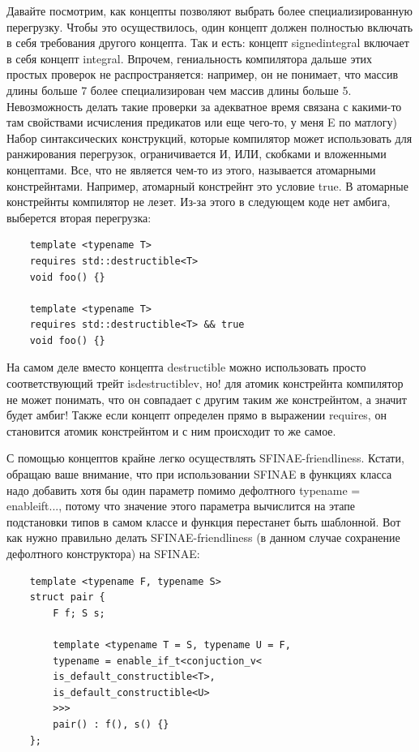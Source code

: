 \documentclass[12pt, a4paper]{article}
\begin{document}
\par Давайте посмотрим, как концепты позволяют выбрать более специализированную перегрузку. Чтобы это осуществилось, один концепт должен полностью включать в себя требования другого концепта. Так и есть: концепт signed\textunderscore integral включает в себя концепт integral. Впрочем, гениальность компилятора дальше этих простых проверок не распространяется: например, он не понимает, что массив длины больше 7 более специализирован чем массив длины больше 5. Невозможность делать такие проверки за адекватное время связана с какими-то там свойствами исчисления предикатов или еще чего-то, у меня E по матлогу) Набор синтаксических конструкций, которые компилятор может использовать для ранжирования перегрузок, ограничивается И, ИЛИ, скобками и вложенными концептами. Все, что не является чем-то из этого, называется атомарными констрейнтами. Например, атомарный констрейнт это условие true. В атомарные констрейнты компилятор не лезет. Из-за этого в следующем коде нет амбига, выберется вторая перегрузка:
\begin{verbatim}
	template <typename T>
	requires std::destructible<T>
	void foo() {}
	
	template <typename T>
	requires std::destructible<T> && true
	void foo() {}
\end{verbatim}
На самом деле вместо концепта destructible можно использовать просто соответствующий трейт is\textunderscore destructible\textunderscore v, но! для атомик констрейнта компилятор не может понимать, что он совпадает с другим таким же констрейнтом, а значит будет амбиг! Также если концепт определен прямо в выражении requires, он становится атомик констрейнтом и с ним происходит то же самое.
\par С помощью концептов крайне легко осуществлять SFINAE-friendliness. Кстати, обращаю ваше внимание, что при использовании SFINAE в функциях класса надо добавить хотя бы один параметр помимо дефолтного typename = enable\textunderscore if\textunderscore t..., потому что значение этого параметра вычислится на этапе подстановки типов в самом классе и функция перестанет быть шаблонной. Вот как нужно правильно делать SFINAE-friendliness (в данном случае сохранение дефолтного конструктора) на SFINAE:
\begin{verbatim}
	template <typename F, typename S>
	struct pair {
		F f; S s;
		
		template <typename T = S, typename U = F,
		typename = enable_if_t<conjuction_v<
		is_default_constructible<T>,
		is_default_constructible<U>
		>>>
		pair() : f(), s() {}
	};
\end{verbatim}
\end{document}
